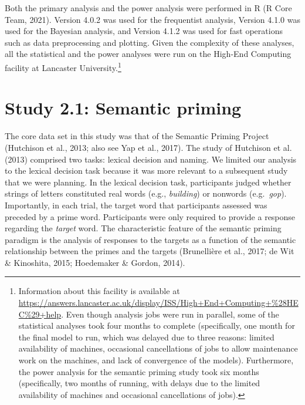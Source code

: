 \documentclass[
  12pt,
  man,floatsintext]{apa7}
\begin{document}
Both the primary analysis and the power analysis were performed in R (R Core Team, 2021). Version 4.0.2 was used for the frequentist analysis, Version 4.1.0 was used for the Bayesian analysis, and Version 4.1.2 was used for fast operations such as data preprocessing and plotting. Given the complexity of these analyses, all the statistical and the power analyses were run on the High-End Computing facility at Lancaster University.\footnote{Information about this facility is available at \url{https://answers.lancaster.ac.uk/display/ISS/High+End+Computing+\%28HEC\%29+help}. Even though analysis jobs were run in parallel, some of the statistical analyses took four months to complete (specifically, one month for the final model to run, which was delayed due to three reasons: limited availability of machines, occasional cancellations of jobs to allow maintenance work on the machines, and lack of convergence of the models). Furthermore, the power analysis for the semantic priming study took six months (specifically, two months of running, with delays due to the limited availability of machines and occasional cancellations of jobs).}

\hypertarget{study-2.1-semantic-priming}{%
\section{Study 2.1: Semantic priming}\label{study-2.1-semantic-priming}}

The core data set in this study was that of the Semantic Priming Project (Hutchison et al., 2013; also see Yap et al., 2017). The study of Hutchison et al. (2013) comprised two tasks: lexical decision and naming. We limited our analysis to the lexical decision task because it was more relevant to a subsequent study that we were planning. In the lexical decision task, participants judged whether strings of letters constituted real words (e.g., \emph{building}) or nonwords (e.g.~\emph{gop}). Importantly, in each trial, the target word that participants assessed was preceded by a prime word. Participants were only required to provide a response regarding the \emph{target} word. The characteristic feature of the semantic priming paradigm is the analysis of responses to the targets as a function of the semantic relationship between the primes and the targets (Brunellière et al., 2017; de Wit \& Kinoshita, 2015; Hoedemaker \& Gordon, 2014).
\end{document}
